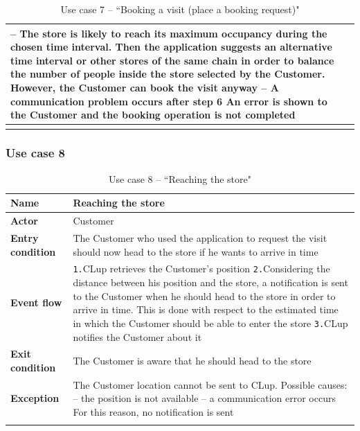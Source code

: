 \documentclass[a4paper,oneside,11pt]{book}   %
\begin{document}
\begin{longtable}[c] { |>{\bfseries{}}C{0.25\textwidth}|V{0.55\textwidth}| }
        -- The store is likely to reach its maximum occupancy during the chosen time interval. Then the application suggests an alternative time interval or other stores of the same chain in order to balance the number of people inside the store selected by the Customer. However, the Customer can book the visit anyway \newline
        -- A communication problem occurs after step 6 \newline
        An error is shown to the Customer and the booking operation is not completed \\
        \hline
    \caption{Use case 7 -- ``Booking a visit (place a booking request)"}
    \label{table:use_case_07}
    \end{longtable}
    
    \subsubsection{Use case 8}
    \begin{longtable}[c] { |>{\bfseries{}}C{0.25\textwidth}|V{0.55\textwidth}| }
        \hline
        Name            & Reaching the store \\ \hline
        Actor           & Customer \\ \hline
        Entry condition & The Customer who used the application to request the visit should now head to the store if he wants to arrive in time  \\ \hline
        Event flow      & 
        \texttt{1.}CLup retrieves the Customer’s position \newline
        \texttt{2.}Considering the distance between his position and the store, a notification is sent to the Customer when he should head to the store in order to arrive in time. This is done with respect to the estimated time in which the Customer should be able to enter the store \newline
        \texttt{3.}CLup notifies the Customer about it \\ \hline
        Exit condition  & The Customer is aware that he should head to the store \\ \hline
        Exception       & The Customer location cannot be sent to CLup. Possible causes: \newline
        -- the position is not available \newline
        -- a communication error occurs \newline
        For this reason, no notification is sent \\
        \hline
    \caption{Use case 8 -- ``Reaching the store"}
    \label{table:use_case_08}
    \end{longtable}
    
\end{document}
